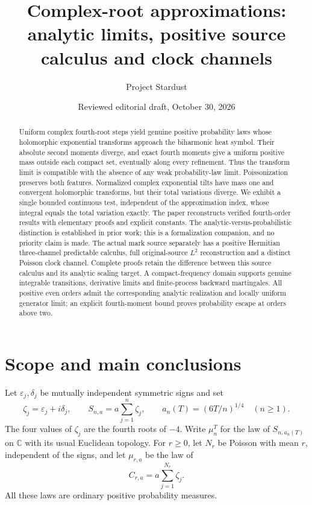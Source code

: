 \documentclass[11pt]{article}
\title{Complex-root approximations:\\analytic limits, positive source calculus and clock channels}
\author{Project Stardust}
\date{Reviewed editorial draft, October 30, 2026}
\newcommand{\C}{\mathbb C}\newcommand{\R}{\mathbb R}
\begin{document}
\maketitle
\begin{abstract}
Uniform complex fourth-root steps yield genuine positive probability laws
whose holomorphic exponential transforms approach the biharmonic heat
symbol. Their absolute second moments diverge, and exact fourth moments
give a uniform positive mass outside each compact set, eventually along
every refinement. Thus the transform limit is compatible with the absence
of any weak probability-law limit. Poissonization preserves both features.
Normalized complex exponential tilts have mass one and convergent
holomorphic transforms, but their total variations diverge. We exhibit a
single bounded continuous test, independent of the approximation index,
whose integral equals the total variation exactly. The paper reconstructs
verified fourth-order results with elementary proofs and explicit
constants. The analytic-versus-probabilistic distinction is established
in prior work; this is a formalization companion, and no priority claim
is made.
The actual mark source separately has a positive Hermitian three-channel predictable calculus, full original-source $L^2$ reconstruction and a distinct Poisson clock channel. Complete proofs retain the difference between this source calculus and its analytic scaling target. A compact-frequency domain supports genuine integrable transitions, derivative limits and finite-process backward martingales. All positive even orders admit the corresponding analytic realization and locally uniform generator limit; an explicit fourth-moment bound proves probability escape at orders above two. \end{abstract}

\section{Scope and main conclusions}
Let $\varepsilon_j,\delta_j$ be mutually independent symmetric signs and set
\[
 \zeta_j=\varepsilon_j+i\delta_j,\qquad
 S_{n,a}=a\sum_{j=1}^n\zeta_j,\qquad
 a_n(T)=(6T/n)^{1/4}\quad(n\geq1).
\]
The four values of $\zeta_j$ are the fourth roots of $-4$.
Write $\mu_n^T$ for the law of $S_{n,a_n(T)}$ on $\C$ with its usual
Euclidean topology. For $r\geq0$, let $N_r$ be Poisson with mean $r$,
independent of the signs, and let $\mu_{r,a}$ be the law of
\[
 C_{r,a}=a\sum_{j=1}^{N_r}\zeta_j.
\]
All these laws are ordinary positive probability measures.
\end{document}
